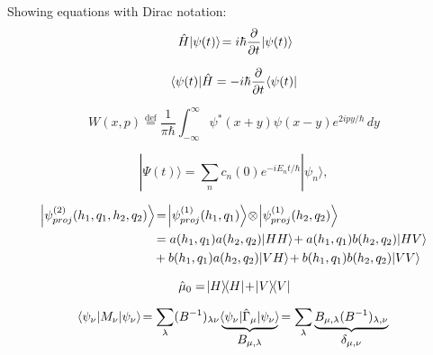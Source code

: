 Showing equations with Dirac notation:
\begin{equation}
  \label{eq:Dirac0-ket}
  {\displaystyle \hat{H} \!\left|\psi (t)\right\rangle\! = i\hbar \frac {\partial }{\partial t} \!\left|\psi (t)\right\rangle\!}
\end{equation}

\begin{equation}
  \label{eq:Dirac0-bra}
  {\displaystyle \!\left\langle\psi (t)\right|\!\hat{H} = -i\hbar \frac {\partial }{\partial t} \!\left\langle\psi (t)\right|\!}
\end{equation}

\begin{equation}
  \label{eq:Wigner}
  W(x,p)\stackrel{\mathrm{def}}{=}\frac{1}{\pi\hbar}\int_{-\infty}^\infty \psi^*(x+y)\psi(x-y)e^{2ipy/\hbar}\,dy
\end{equation}

\begin{equation}
  |\Psi(t)\rangle=\sum_{n}c_{n}(0)e^{-iE_{n}t/\hbar}|\psi_n\rangle,
\end{equation}

\begin{align}
  \ket {\psi_{proj}^{(2)}(h_1, q_1, h_2, q_2)} &= \ket {\psi_{proj}^{(1)}(h_1, q_1)} \otimes 
                                                 \ket {\psi_{proj}^{(1)}(h_2, q_2)} \nonumber \\
                                               &= a(h_1,q_1)a(h_2,q_2)\ket{HH} + a(h_1,q_1)b(h_2,q_2)\ket{HV} \nonumber \\
                                               &+ b(h_1,q_1)a(h_2,q_2)\ket{VH} + b(h_1,q_1)b(h_2,q_2)\ket{VV}
\end{align}

\begin{equation}
  \label{eq:Dirac1}
  \hat{\mu}_0=\ketbra{H}{H}+\ketbra{V}{V}
\end{equation}

\begin{equation}
  \label{eq:Dirac2}
  \matrixel{\psi_\nu}{M_\nu}{\psi_\nu} = \sum_\lambda (B^{-1})_{\lambda \nu} \underbrace{\matrixel{\psi_\nu}{\hat\Gamma_\mu}{\psi_\nu}}_\text{\normalsize{$B_{\mu, \lambda}$}} = 
  \sum_\lambda \underbrace{B_{\mu, \lambda} (B^{-1})_{\lambda, \nu}}_\text{\normalsize{$\delta_{\mu, \nu}$}}
\end{equation}

